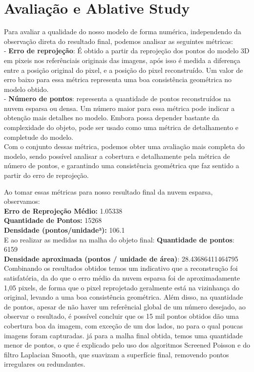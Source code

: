 \documentclass[12pt]{article}
\begin{document}
\section{Avaliação e Ablative Study}
Para avaliar a qualidade do nosso modelo de forma numérica, independendo da observação direta do resultado final, podemos analisar as seguintes métricas:\\
- \textbf{Erro de reprojeção}: É obtido a partir da reprojeção dos pontos do modelo 3D em pixeis nos referênciais originais das imagens, após isso é medida a diferença entre a posição original do pixel, e a posição do pixel reconstruído. Um valor de erro baixo para essa métrica representa uma boa consistência geométrica no modelo obtido.\\
- \textbf{Número de pontos}: representa a quantidade de pontos reconstruídos na nuvem esparsa ou densa. Um número maior para essa métrica pode indicar a obtenção mais detalhes no modelo. Embora possa depender bastante da complexidade do objeto, pode ser usado como uma métrica de detalhamento e completude do modelo.\\
Com o conjunto dessas métrica, podemos obter uma avaliação mais completa do modelo, sendo possível analisar a cobertura e detalhamente pela métrica  de número de pontos, e garantindo uma consistência geométrica que faz sentido a partir do erro de reprojeção.

Ao tomar essas métricas para nosso resultado final da nuvem esparsa, observamos:\\
\textbf{Erro de Reprojeção Médio:} 1.05338\\
\textbf{Quantidade de Pontos:} 15268\\
\textbf{Densidade (pontos/unidade³):} 106.1\\
E ao realizar as medidas na malha do objeto final:
\textbf{Quantidade de pontos}: 6159\\
\textbf{Densidade aproximada (pontos / unidade de área)}: 28.43686411464795\\

Combinando os resultados obtidos temos um indicativo que a reconstrução foi satisfatória, da do que o erro médio da nuvem esparsa foi de aproximadamente 1,05 pixels, de forma que o pixel reprojetado geralmente está na vizinhança do original, levando a uma boa consistência geométrica. Além disso, na quantidade de pontos, apesar de não haver um referêncial global de um número desejado, ao observar o resultado, é possível concluir que os 15 mil pontos obtidos dão uma cobertura boa da imagem, com exceção de um dos lados, no para o qual poucas imagens foram capturadas. já para a malha final obtida, temos uma quantidade menor de pontos, o que é explicado pelo uso dos algoritmos Screened Poisson e do filtro Laplacian Smooth, que suavizam a superfície final, removendo pontos irregulares ou redundantes.
\end{document}
